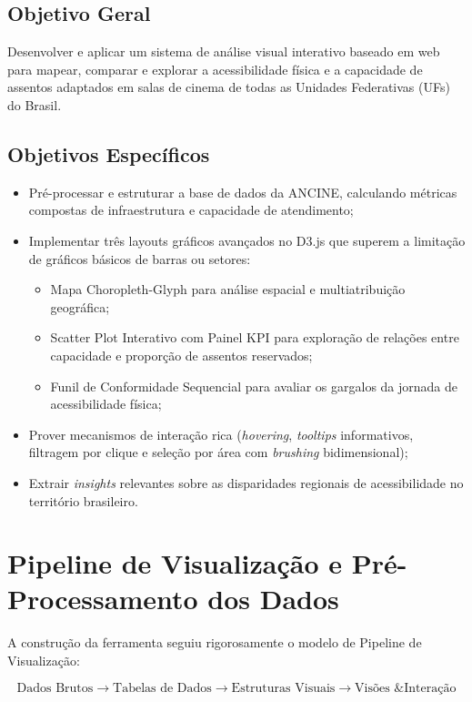 \documentclass[12pt]{article}
\begin{document}
\subsection{Objetivo Geral}

Desenvolver e aplicar um sistema de análise visual interativo baseado em web para mapear, 
comparar e explorar a acessibilidade física e a capacidade de assentos adaptados em salas 
de cinema de todas as Unidades Federativas (UFs) do Brasil.

\subsection{Objetivos Específicos}
\begin{itemize}
    \item Pré-processar e estruturar a base de dados da ANCINE, calculando métricas compostas de infraestrutura e capacidade de atendimento;
    \item Implementar três layouts gráficos avançados no D3.js que superem a limitação de gráficos básicos de barras ou setores:
    \begin{itemize}
        \item Mapa Choropleth-Glyph para análise espacial e multiatribuição geográfica;  
        \item Scatter Plot Interativo com Painel KPI para exploração de relações entre capacidade e proporção de assentos reservados;
        \item Funil de Conformidade Sequencial para avaliar os gargalos da jornada de acessibilidade física;
    \end{itemize}
    \item Prover mecanismos de interação rica (\textit{hovering}, \textit{tooltips} informativos, filtragem por clique e seleção por área com \textit{brushing} bidimensional);
    \item Extrair \textit{insights} relevantes sobre as disparidades regionais de acessibilidade no território brasileiro.
\end{itemize}

\section{Pipeline de Visualização e Pré-Processamento dos Dados}

A construção da ferramenta seguiu rigorosamente o modelo de Pipeline de Visualização:

\[
\text{Dados Brutos} \longrightarrow \text{Tabelas de Dados} \longrightarrow \text{Estruturas Visuais} \longrightarrow \text{Visões \& Interação}
\]
\end{document}
